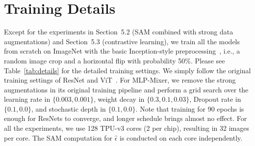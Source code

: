 \section{Training Details}
Except for the experiments in Section~5.2 (SAM combined with strong data augmentations) and Section~5.3 (contrastive learning), we train all the models from scratch on ImageNet with the basic Inception-style preprocessing~\cite{szegedy2016inception}, i.e., a random image crop and a horizontal flip with probability 50\%. 
Please see Table~\ref{tab:details} for the detailed training settings.
We simply follow the original training settings of ResNet and ViT~\cite{alexander202bit, dosovitskiy2021an}. 
For MLP-Mixer, we remove the strong augmentations in its original training pipeline and perform a grid search over the learning rate in $\{0.003, 0.001\}$, weight decay in $\{0.3, 0.1, 0.03\}$, Dropout rate in $\{0.1, 0.0\}$, and stochastic depth in $\{0.1, 0.0\}$.
Note that training for 90 epochs is enough for ResNets to converge, and longer schedule brings almost no effect.
For all the experiments, we use 128 TPU-v3 cores (2 per chip), resulting in 32 images per core.
The SAM computation for $\hat{\epsilon}$ is conducted on each core independently. %


